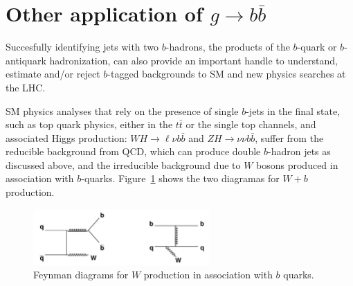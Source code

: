 \section{Other application of $g \rightarrow b\bar{b}$}


Succesfully identifying jets with two $b$-hadrons, the products of the $b$-quark or $b$-antiquark hadronization, 
can also provide an important handle to understand, estimate and/or reject $b$-tagged backgrounds to SM and new physics searches at the LHC.

SM physics analyses that rely on the presence of single $b$-jets in the final state, such as top quark physics, either in the $t\bar{t}$ or the single top channels, and associated Higgs production: $WH\rightarrow\ell\nu b\bar{b}$ and $ZH\rightarrow\nu\nu b\bar{b}$,  suffer from  %
the reducible background from QCD, which can produce double $b$-hadron jets as discussed above, and the irreducible background due to $W$ bosons produced in association with $b$-quarks.
Figure~\ref{fig:Wplusb} shows the two diagramas %
for $W+b$ production. %

\begin{figure}[htbp]
  \begin{center}
      \includegraphics[width=0.6\textwidth]{FIGS/Wbb_diagram.jpg}
    \caption{Feynman diagrams for $W$ production in association with $b$ quarks.}
    \label{fig:Wplusb}
  \end{center}
\end{figure}

